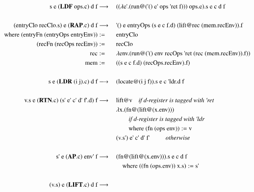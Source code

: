 \documentclass[a4paper,12pt,twoside,openright]{report}
\theoremstyle{definition}
\newcommand{\ts}{\textquotesingle}
\begin{document}
\begingroup
\allowdisplaybreaks
\begin{figure}[htp!]
\centering
\begin{alignat}{5}
		\text{s e (} \mathbf{LDF} \text{ ops.c) d f} & \longrightarrow \: && \text{(($\lambda$e{\ts}.(run@({\ts}() e{\ts} ops {\ts}ret f))) ops.e).s e c d f} \label{eq:secd_sem_ldf} \\
		\nonumber \\%
		\text{(entryClo recClo.s) e (} \mathbf{RAP}\text{.c) d f} & \longrightarrow \: && \text{{\ts}() e entryOps (s e c f.d) (lift@rec (mem.recEnv)).f} \label{eq:secd_sem_rap} \\
		\text{where (entryFn (entryOps entryEnv))} & := && \text{entryClo} \nonumber \\
		\text{(recFn (recOps recEnv))} & := && \text{recClo} \nonumber \\
		\text{rec} & := && \text{$\lambda$env.(run@({\ts}() env recOps {\ts}ret (rec (mem.recEnv)).f))} \nonumber \\
		\text{mem} & := && \text{((s e c f.d) (recOps.recEnv).f)} \nonumber \\
		\nonumber \\%
		\text{s e (} \mathbf{LDR} \text{ (i j).c) d f} & \longrightarrow \: && \text{(locate@(i j f)).s e c {\ts}ldr.d f} \\
		\nonumber \\%
		\text{v.s e (} \mathbf{RTN}\text{.c) (s{\ts} e{\ts} c{\ts}  d{\ts}  f{\ts}.d) f} & \longrightarrow \:
		 && \text{lift@v} 									\quad	\text{\textit{if d-register is tagged with {\ts}ret}}	\\
		 & && \text{$\lambda$x.(fn@(lift@(x.env)))} \nonumber \\
		 & && \qquad\text{\textit{if d-register is tagged with {\ts}ldr}} \nonumber \\
		 & && \qquad\text{where (fn (ops env))} := \text{v} \nonumber \\
 		 & && \text{(v.s{\ts})  e{\ts}  c{\ts}  d{\ts}  f{\ts}}	\qquad\;\;\text{\textit{otherwise}} \nonumber \\
 		\nonumber \\%
		\text{s{\ts} e (} \mathbf{AP}\text{.c) env{\ts} f} & \longrightarrow \: && \text{(fn@(lift@(x.env))).s e c d f} \\
		& && \quad\text{where ((fn (ops.env)) x.s)} := \text{s{\ts}} \nonumber \\
		\nonumber \\%
		\text{(v.s) e (} \mathbf{LIFT}\text{.c) d f} & \longrightarrow \: \label{eq:secd_sem_lift}

\end{alignat}
\end{figure}
\end{document}
